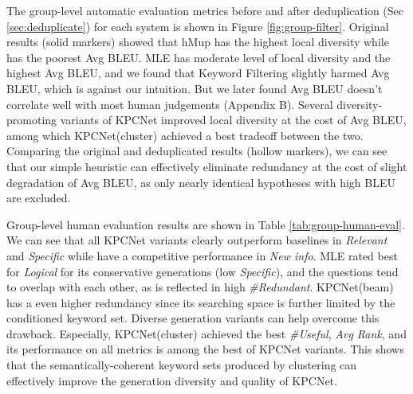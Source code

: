The group-level automatic evaluation metrics before and after deduplication  (Sec \ref{sec:deduplicate}) for each system is shown in Figure \ref{fig:group-filter}. Original results (solid markers) showed that hMup has the highest local diversity while has the poorest Avg BLEU. MLE has moderate level of local diversity and the highest Avg BLEU, and we found that Keyword Filtering slightly harmed Avg BLEU, which is against our intuition. But we later found Avg BLEU doesn't correlate well with most human judgements (Appendix B). Several diversity-promoting variants of KPCNet improved local diversity at the cost of Avg BLEU, among which KPCNet(cluster) achieved a best tradeoff between the two. Comparing the original and deduplicated results (hollow markers), we can see that our simple heuristic can effectively eliminate redundancy at the cost of slight degradation of Avg BLEU, as only nearly identical hypotheses with high BLEU are excluded. 

Group-level human evaluation results are shown in Table \ref{tab:group-human-eval}. We can see that all KPCNet variants clearly outperform baselines in \textit{Relevant} and \textit{Specific} while have a competitive performance in \textit{New info}. MLE rated best for \textit{Logical} for its conservative generations (low \textit{Specific}), and the questions tend to overlap with each other, as is reflected in high \textit{\#Redundant}. KPCNet(beam) has a even higher redundancy since its searching space is further limited by the conditioned keyword set. Diverse generation variants can help overcome this drawback. Especially, KPCNet(cluster) achieved the best \textit{\#Useful}, \textit{Avg Rank}, and its performance on all metrics is among the best of KPCNet variants. This shows that the semantically-coherent keyword sets produced by clustering can effectively improve the generation diversity and quality of KPCNet. 

